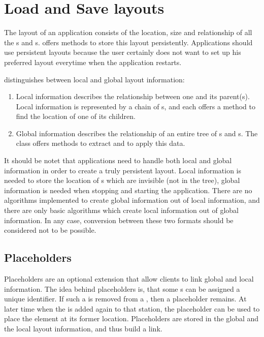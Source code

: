 \section{Load and Save layouts}
The layout of an application consists of the location, size and relationship of all the s and s.  offers methods to store this layout persistently. Applications should use persistent layouts because the user certainly does not want to set up his preferred layout everytime when the application restarts.

 distinguishes between local and global layout information:
\begin{enumerate}
 \item Local information describes the relationship between one  and its parent(s). Local information is represented by a chain of s, and each  offers a method  to find the location of one of its children.
 \item Global information describes the relationship of an entire tree of s and s. The class  offers methods to extract and to apply this data.
\end{enumerate}

It should be notet that applications need to handle both local and global information in order to create a truly persistent layout. Local information is needed to store the location of s which are invisible (not in the tree), global information is needed when stopping and starting the application. There are no algorithms implemented to create global information out of local information, and there are only basic algorithms which create local information out of global information. In any case, conversion between these two formats should be considered not to be possible.


\subsection{Placeholders}
Placeholders are an optional extension that allow clients to link global and local information. The idea behind placeholders is, that some s can be assigned a unique identifier. If such a  is removed from a , then a placeholder remains. At later time when the  is added again to that station, the placeholder can be used to place the element at its former location. Placeholders are stored in the global and the local layout information, and thus build a link.

